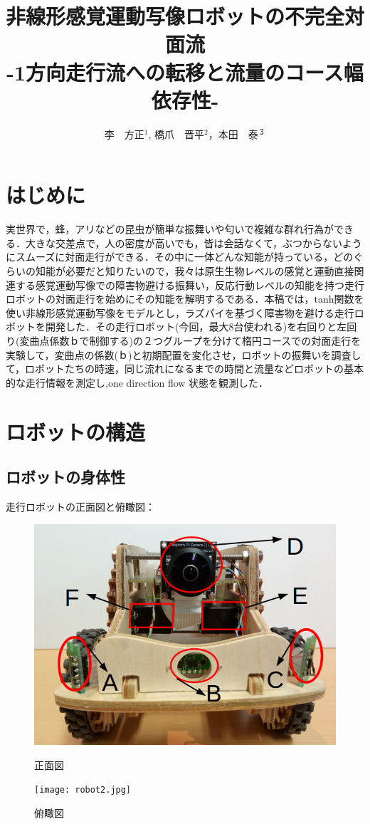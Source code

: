 \documentclass[twocolumn]{jarticle} %
\title{%
非線形感覚運動写像ロボットの不完全対面流\\
{\Large -1方向走行流への転移と流量のコース幅依存性-}
}
\author{%
李　方正$^1$, 橋爪　晋平$^2$，本田　泰$^３$
}
\affiliation{%
$^1$ 室蘭工業大学大学院　工学研究科　情報電子工学系専攻\\
$^2$ 室蘭工業大学　工学部　情報電子工学系学科\\
$^3$ 室蘭工業大学大学院　しくみ解明系領域
}
\begin{document}
\maketitle

\section{はじめに}
実世界で，蜂，アリなどの昆虫が簡単な振舞いや匂いで複雑な群れ行為ができる．大きな交差点で，人の密度が高いでも，皆は会話なくて，ぶつからないようにスムーズに対面走行ができる．その中に一体どんな知能が持っている，どのぐらいの知能が必要だと知りたいので，我々は原生生物レベルの感覚と運動直接関連する感覚運動写像での障害物避ける振舞い，反応行動レベルの知能を持つ走行ロボットの対面走行を始めにその知能を解明するである．本稿では，tanh関数を使い非線形感覚運動写像をモデルとし，ラズパイを基づく障害物を避ける走行ロボットを開発した．その走行ロボット(今回，最大8台使われる)を右回りと左回り(変曲点係数ｂで制御する)の２つグループを分けて楕円コースでの対面走行を実験して，変曲点の係数(ｂ)と初期配置を変化させ，ロボットの振舞いを調査して，ロボットたちの時速，同じ流れになるまでの時間と流量などロボットの基本的な走行情報を測定し,one direction flow 状態を観測した．
\section{ロボットの構造}
\subsection{ロボットの身体性}
走行ロボットの正面図と俯瞰図：
\begin{figure}[h]
    \begin{minipage}{0.48\linewidth}
        \centering
        \includegraphics[width=0.9\linewidth]{robot1.jpg}
        \caption{正面図}
    \end{minipage}
    \begin{minipage}{0.48\linewidth}
        \centering
        \texttt{[image: robot2.jpg]}
        \caption{俯瞰図}
    \end{minipage}
\end{figure}
\end{document}
